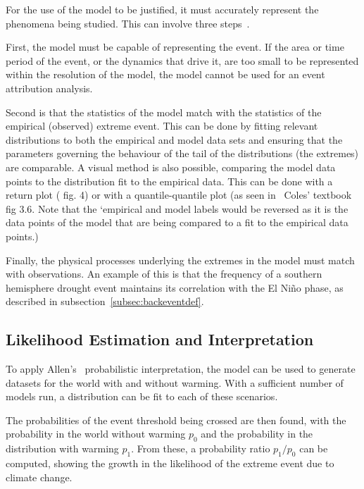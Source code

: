 For the use of the model to be justified,
    it must accurately represent the phenomena being studied.
This can involve three steps~\cite{van_Oldenborgh_et_al_2021}.

First, the model must be capable of representing the event.
If the area or time period of the event,
    or the dynamics that drive it, are too small to be represented within the resolution of the model,
    the model cannot be used for an event attribution analysis.

Second is that the statistics of the model match with the statistics of the empirical (observed) extreme event.
This can be done by fitting relevant distributions to both the empirical and model data sets and ensuring that the
    parameters governing the behaviour of the tail of the distributions (the extremes) are comparable.
A visual method is also possible, comparing the model data points to the distribution fit to the empirical data.
This can be done with a return plot (\cite{van_Oldenborgh_et_al_2021} fig. 4)
    or with a quantile-quantile plot (as seen in~ Coles' textbook\cite{Coles_2001} fig 3.6. Note that the `empirical and model labels
    would be reversed as it is the data points of the model that are being compared to a fit to the empirical data points.)

Finally,
    the physical processes underlying the extremes in the model must match with observations.
An example of this is that the frequency of a southern hemisphere drought event maintains its correlation with the El Niño phase,
    as described in subsection~\ref{subsec:backeventdef}.

\subsection{Likelihood Estimation and Interpretation}\label{subsec:backlikeest}

To apply Allen's~\cite{Allen_2003} probabilistic interpretation,
    the model can be used to generate datasets for the world with and without warming.
With a sufficient number of models run,
    a distribution can be fit to each of these scenarios.

The probabilities of the event threshold being crossed are then found,
    with the probability in the world without warming $p_0$ and the probability in the distribution with warming $p_1$.
From these, a probability ratio $p_1 / p_0$ can be computed,
    showing the growth in the likelihood of the extreme event due to climate change.

